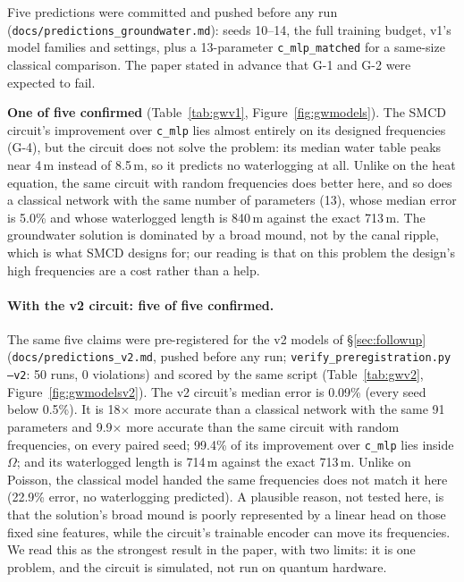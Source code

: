 Five predictions were committed and pushed before any run
(\texttt{docs/predictions\_groundwater.md}): seeds 10--14, the full training budget,
v1's model families and settings, plus a 13-parameter \texttt{c\_mlp\_matched} for a
same-size classical comparison. The paper stated in advance that G-1 and G-2 were
expected to fail.



\textbf{One of five confirmed} (Table~\ref{tab:gwv1}, Figure~\ref{fig:gwmodels}). The
SMCD circuit's improvement over \texttt{c\_mlp} lies almost entirely on its designed
frequencies (G-4), but the circuit does not solve the problem: its median water table
peaks near 4\,m instead of 8.5\,m, so it predicts no waterlogging at all. Unlike on the
heat equation, the same circuit with random frequencies does better here, and so does
a classical network with the same number of parameters (13), whose median error is
5.0\% and whose waterlogged length is 840\,m against the exact 713\,m. The
groundwater solution is dominated by a broad mound, not by the canal ripple, which is
what SMCD designs for; our reading is that on this problem the design's high
frequencies are a cost rather than a help.

\paragraph{With the v2 circuit: five of five confirmed.} The same five claims were
pre-registered for the v2 models of \S\ref{sec:followup}
(\texttt{docs/predictions\_v2.md}, pushed before any run;
\texttt{verify\_preregistration.py --v2}: 50 runs, 0 violations) and scored by the same
script (Table~\ref{tab:gwv2}, Figure~\ref{fig:gwmodelsv2}). The v2 circuit's median
error is 0.09\% (every seed below 0.5\%). It is 18$\times$ more accurate than a classical
network with the same 91 parameters and 9.9$\times$ more accurate than the same circuit
with random frequencies, on every paired seed; 99.4\% of its improvement over
\texttt{c\_mlp} lies inside $\Omega$; and its waterlogged length is 714\,m against the
exact 713\,m. Unlike on Poisson, the classical model handed the same frequencies does
not match it here (22.9\% error, no waterlogging predicted). A plausible reason, not
tested here, is that the solution's broad mound is poorly represented by a linear head
on those fixed sine features, while the circuit's trainable encoder can move its
frequencies. We read this as the strongest result in the
paper, with two limits: it is one problem, and the circuit is simulated, not run on
quantum hardware.

